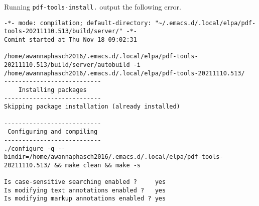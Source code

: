 \documentclass[11pt]{article}
\begin{document}
\begin{enumerate}
\begin{enumerate}
Running \texttt{pdf-tools-install.} output the following error.
\begin{verbatim}
-*- mode: compilation; default-directory: "~/.emacs.d/.local/elpa/pdf-tools-20211110.513/build/server/" -*-
Comint started at Thu Nov 18 09:02:31

/home/awannaphasch2016/.emacs.d/.local/elpa/pdf-tools-20211110.513/build/server/autobuild -i /home/awannaphasch2016/.emacs.d/.local/elpa/pdf-tools-20211110.513/
---------------------------
    Installing packages
---------------------------
Skipping package installation (already installed)

---------------------------
 Configuring and compiling
---------------------------
./configure -q --bindir=/home/awannaphasch2016/.emacs.d/.local/elpa/pdf-tools-20211110.513/ && make clean && make -s

Is case-sensitive searching enabled ?     yes
Is modifying text annotations enabled ?   yes
Is modifying markup annotations enabled ? yes


\end{verbatim}
\end{enumerate}
\end{enumerate}
\end{document}
